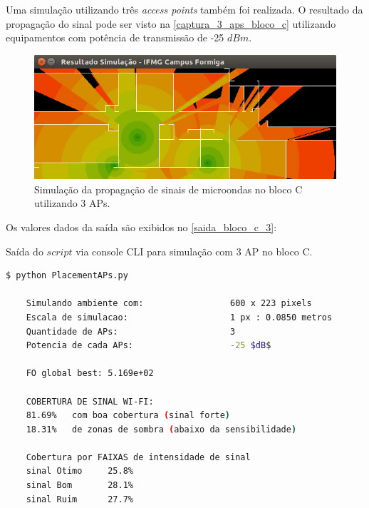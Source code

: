 \documentclass[
	12pt,				%
	twoside,			%
	a4paper,			%
	english,			%
	french,				%
	spanish,			%
	brazil				%
	]{abntex2}
\begin{document}
Uma simulação utilizando três \emph{access points} também foi realizada.
O resultado da propagação do sinal pode ser visto na
\autoref{captura_3_aps_bloco_c} utilizando equipamentos com potência de
transmissão de -25 \(dBm\).

\begin{figure}[ht]
    \caption{\label{captura_3_aps_bloco_c} Simulação da propagação de sinais de microondas no bloco C utilizando 3 APs. }
    \begin{center}
        \includegraphics[scale=0.7]{imagens/captura-3-aps-bloco-c.jpg}
    \end{center}
\end{figure}

Os valores dados da saída são exibidos no \autoref{saida_bloco_c_3}:

\begin{quadro}[!htb]
    \caption{\label{saida_bloco_c_3} Saída do $script$ via console CLI para simulação com 3 AP no bloco C. }

    \begin{lstlisting}[language=bash]
    $ python PlacementAPs.py 

    Simulando ambiente com:                 600 x 223 pixels
    Escala de simulacao:                    1 px : 0.0850 metros
    Quantidade de APs:                      3
    Potencia de cada APs:                   -25 $dB$

    FO global best: 5.169e+02

    COBERTURA DE SINAL WI-FI:
    81.69%   com boa cobertura (sinal forte)
    18.31%   de zonas de sombra (abaixo da sensibilidade)

    Cobertura por FAIXAS de intensidade de sinal
    sinal Otimo     25.8%
    sinal Bom       28.1%
    sinal Ruim      27.7%
    \end{lstlisting}

\end{quadro}
\end{document}
